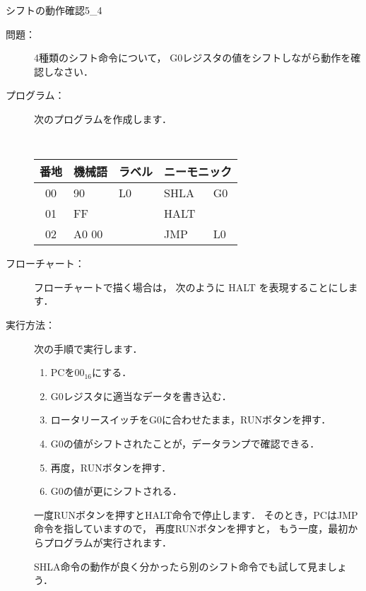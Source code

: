 \newpage
\begin{reidai}{シフトの動作確認}{5_4}
\begin{description}
\item[問題：] 4種類のシフト命令について，
G0レジスタの値をシフトしながら動作を確認しなさい．

\item[プログラム：]
次のプログラムを作成します．

\begin{center}
{\tt\small
\begin{tabular}{|c|l|l|l l|} \hline
番地 & 機械語 & ラベル & \multicolumn{2}{|c|}{ニーモニック} \\
\hline
00 & 90    & L0  & SHLA & G0     \\
01 & FF    &     & HALT &        \\
02 & A0 00 &     & JMP  & L0     \\
\hline
\end{tabular}
}
\end{center}

\item[フローチャート：] フローチャートで描く場合は，
次のように HALT を表現することにします．

\begin{center}
\end{center}


\item[実行方法：] 次の手順で実行します．
\begin{enumerate}
\item PCを$00_{16}$にする．
\item G0レジスタに適当なデータを書き込む．
\item ロータリースイッチをG0に合わせたまま，RUNボタンを押す．
\item G0の値がシフトされたことが，データランプで確認できる．
\item 再度，RUNボタンを押す．
\item G0の値が更にシフトされる．
\end{enumerate}

\vspace{1ex}
一度RUNボタンを押すとHALT命令で停止します．
そのとき，PCはJMP命令を指していますので，
再度RUNボタンを押すと，
もう一度，最初からプログラムが実行されます．

\vspace{1ex}
SHLA命令の動作が良く分かったら別のシフト命令でも試して見ましょう．

\end{description}
\end{reidai}

